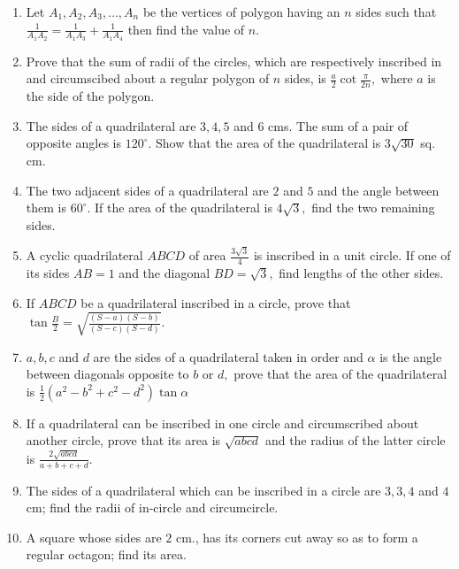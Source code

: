 \begin{enumerate}
\item Let $A_1, A_2, A_3, \ldots, A_n$ be the vertices of polygon having an $n$ sides such that $\frac{1}{A_1A_2} =
   \frac{1}{A_1A_3} + \frac{1}{A_1A_4}$ then find the value of $n.$

\item Prove that the sum of radii of the circles, which are respectively inscribed in and circumscibed about a regular polygon of
   $n$ sides, is $\frac{a}{2}\cot\frac{\pi}{2n},$ where $a$ is the side of the polygon.

\item The sides of a quadrilateral are $3, 4, 5$ and $6$ cms. The sum of a pair of opposite angles is $120^\circ.$
   Show that the area of the quadrilateral is $3\sqrt{30}$ sq. cm.

\item The two adjacent sides of a quadrilateral are $2$ and $5$ and the angle between them is $60^\circ.$ If the
   area of the quadrilateral is $4\sqrt{3},$ find the two remaining sides.

\item A cyclic quadrilateral $ABCD$ of area $\frac{3\sqrt{3}}{4}$ is inscribed in a unit circle. If one of its sides
   $AB = 1$ and the diagonal $BD = \sqrt{3},$ find lengths of the other sides.

\item If $ABCD$ be a quadrilateral inscribed in a circle, prove that $\tan\frac{B}{2} = \sqrt{\frac{(S - a)(S - b)}{(S -
   c)(S - d)}}.$

\item $a, b, c$ and $d$ are the sides of a quadrilateral taken in order and $\alpha$ is the angle between diagonals
   opposite to $b$ or $d,$ prove that the area of the quadrilateral is $\frac{1}{2}(a^2 - b^2 + c^2 -
   d^2)\tan\alpha$

\item If a quadrilateral can be inscribed in one circle and circumscribed about another circle, prove that its area is
   $\sqrt{abcd}$ and the radius of the latter circle is $\frac{2\sqrt{abcd}}{a + b + c + d}.$

\item The sides of a quadrilateral which can be inscribed in a circle are $3, 3, 4$ and $4$ cm; find the radii of
   in-circle and circumcircle.

\item A square whose sides are $2$ cm., has its corners cut away so as to form a regular octagon; find its area.


\end{enumerate}
